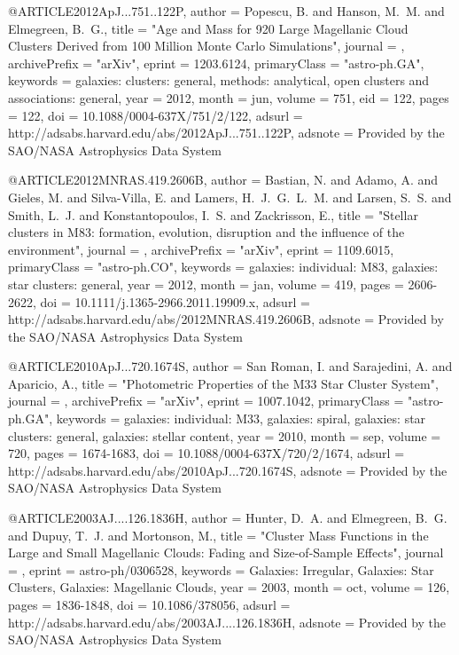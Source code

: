 @ARTICLE{2012ApJ...751..122P,
   author = {{Popescu}, B. and {Hanson}, M.~M. and {Elmegreen}, B.~G.},
    title = "{Age and Mass for 920 Large Magellanic Cloud Clusters Derived from 100 Million Monte Carlo Simulations}",
  journal = {\apj},
archivePrefix = "arXiv",
   eprint = {1203.6124},
 primaryClass = "astro-ph.GA",
 keywords = {galaxies: clusters: general, methods: analytical, open clusters and associations: general},
     year = 2012,
    month = jun,
   volume = 751,
      eid = {122},
    pages = {122},
      doi = {10.1088/0004-637X/751/2/122},
   adsurl = {http://adsabs.harvard.edu/abs/2012ApJ...751..122P},
  adsnote = {Provided by the SAO/NASA Astrophysics Data System}
}

@ARTICLE{2012MNRAS.419.2606B,
   author = {{Bastian}, N. and {Adamo}, A. and {Gieles}, M. and {Silva-Villa}, E. and 
	{Lamers}, H.~J.~G.~L.~M. and {Larsen}, S.~S. and {Smith}, L.~J. and 
	{Konstantopoulos}, I.~S. and {Zackrisson}, E.},
    title = "{Stellar clusters in M83: formation, evolution, disruption and the influence of the environment}",
  journal = {\mnras},
archivePrefix = "arXiv",
   eprint = {1109.6015},
 primaryClass = "astro-ph.CO",
 keywords = {galaxies: individual: M83, galaxies: star clusters: general},
     year = 2012,
    month = jan,
   volume = 419,
    pages = {2606-2622},
      doi = {10.1111/j.1365-2966.2011.19909.x},
   adsurl = {http://adsabs.harvard.edu/abs/2012MNRAS.419.2606B},
  adsnote = {Provided by the SAO/NASA Astrophysics Data System}
}

@ARTICLE{2010ApJ...720.1674S,
   author = {{San Roman}, I. and {Sarajedini}, A. and {Aparicio}, A.},
    title = "{Photometric Properties of the M33 Star Cluster System}",
  journal = {\apj},
archivePrefix = "arXiv",
   eprint = {1007.1042},
 primaryClass = "astro-ph.GA",
 keywords = {galaxies: individual: M33, galaxies: spiral, galaxies: star clusters: general, galaxies: stellar content},
     year = 2010,
    month = sep,
   volume = 720,
    pages = {1674-1683},
      doi = {10.1088/0004-637X/720/2/1674},
   adsurl = {http://adsabs.harvard.edu/abs/2010ApJ...720.1674S},
  adsnote = {Provided by the SAO/NASA Astrophysics Data System}
}

@ARTICLE{2003AJ....126.1836H,
   author = {{Hunter}, D.~A. and {Elmegreen}, B.~G. and {Dupuy}, T.~J. and 
	{Mortonson}, M.},
    title = "{Cluster Mass Functions in the Large and Small Magellanic Clouds: Fading and Size-of-Sample Effects}",
  journal = {\aj},
   eprint = {astro-ph/0306528},
 keywords = {Galaxies: Irregular, Galaxies: Star Clusters, Galaxies: Magellanic Clouds},
     year = 2003,
    month = oct,
   volume = 126,
    pages = {1836-1848},
      doi = {10.1086/378056},
   adsurl = {http://adsabs.harvard.edu/abs/2003AJ....126.1836H},
  adsnote = {Provided by the SAO/NASA Astrophysics Data System}
}

